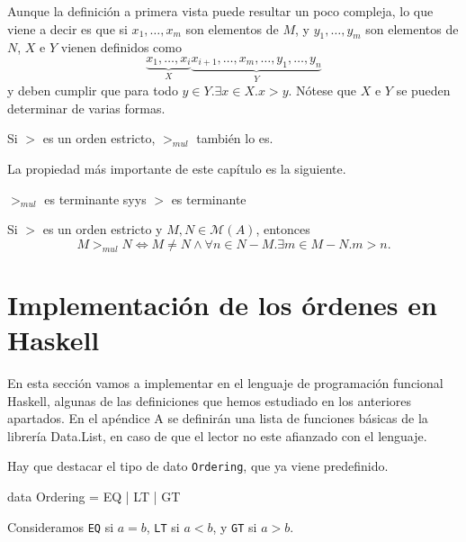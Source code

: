 Aunque la definición a primera vista puede resultar un poco compleja, lo que
viene a decir es que si $x_1, \dots, x_m$ son elementos de $M$, y
$y_1, \dots, y_m$ son elementos de $N$, $X$ e $Y$ vienen definidos como
\[ \underbrace{x_1, \dots, x_i}_{X} 
   \underbrace{x_{i+1}, \dots, x_m, \dots, y_1, \dots, y_n}_{Y} \] 
y deben cumplir que para todo $y \in Y. \exists x \in X. x>y$. Nótese que $X$
e $Y$ se pueden determinar de varias formas.

\begin{lema}
  Si $>$ es un orden estricto, $>_{mul}$ también lo es.
\end{lema}

La propiedad más importante de este capítulo es la siguiente.

\begin{teor}
  $>_{mul}$ es terminante syys $>$ es terminante
\end{teor}

\begin{lema}\label{lemordsyss}
  Si $>$ es un orden estricto y $M,N \in \mathcal{M}(A)$, entonces
  \[ M >_{mul} N\Leftrightarrow M \neq N \wedge 
    \forall n \in N - M. \exists m \in M - N. m > n. \]
\end{lema}


\section{Implementación de los órdenes en Haskell}

En esta sección vamos a implementar en el lenguaje de programación
funcional Haskell, algunas de las definiciones que hemos estudiado en
los anteriores apartados. En el apéndice A se definirán una lista de
funciones básicas de la librería Data.List, en caso de que el lector
no este afianzado con el lenguaje.

Hay que destacar el tipo de dato \texttt{Ordering}, que ya viene predefinido.

\begin{preludio}
data Ordering = EQ | LT | GT
\end{preludio}

Consideramos \texttt{EQ} si $a = b$, \texttt{LT} si $a < b $, y
\texttt{GT} si $a > b$.

